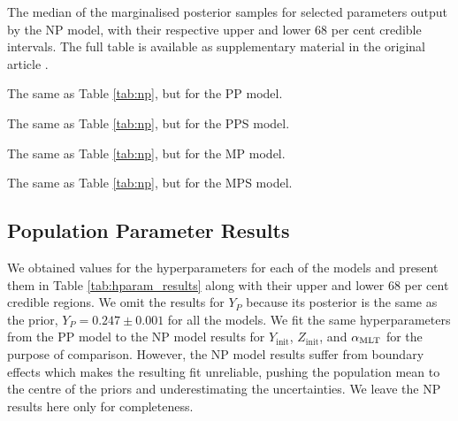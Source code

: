 \begin{landscape}
\begin{table}
	\centering
	\caption[The median of the marginalised posterior samples for selected parameters output by the NP model.]{The median of the marginalised posterior samples for selected parameters output by the NP model, with their respective upper and lower 68 per cent credible intervals. The full table is available as supplementary material in the original article \citep{Lyttle.Davies.ea2021}.}
	\label{tab:np}
	
\end{table}

\begin{table}
	\centering
	\caption{The same as Table \ref{tab:np}, but for the PP model.}
	\label{tab:pp}
	
\end{table}

\begin{table}
	\centering
	\caption{The same as Table \ref{tab:np}, but for the PPS model.}
	\label{tab:pps}
	
\end{table}

\begin{table}
	\centering
	\caption{The same as Table \ref{tab:np}, but for the MP model.}
	\label{tab:mp}
	
\end{table}

\begin{table}
	\centering
	\caption{The same as Table \ref{tab:np}, but for the MPS model.}
	\label{tab:mps}
	
\end{table}
\end{landscape}

\subsection{Population Parameter Results}\label{sec:hparam-results}

We obtained values for the hyperparameters for each of the models and present them in Table \ref{tab:hparam_results} along with their upper and lower 68 per cent credible regions. We omit the results for $Y_P$ because its posterior is the same as the prior, $Y_P=0.247\pm0.001$ for all the models. We fit the same hyperparameters from the PP model to the NP model results for $Y_\mathrm{init}$, $Z_\mathrm{init}$, and ${\alpha_\mathrm{MLT}}$ for the purpose of comparison. However, the NP model results suffer from boundary effects which makes the resulting fit unreliable, pushing the population mean to the centre of the priors and underestimating the uncertainties. We leave the NP results here only for completeness.

